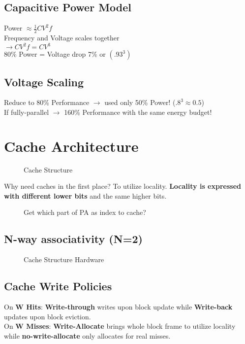 \documentclass{article}
\begin{document}
\begin{multicols*}{2}
\subsection*{Capacitive Power Model}
Power $\approx \frac{1}{2}CV^2f$ \\
Frequency and Voltage scales together \\
$\rightarrow CV^2f = CV^3$ \\
80\% Power = Voltage drop 7\% or $(.93^3)$

\subsection*{Voltage Scaling}
Reduce to 80\% Performance $\rightarrow$ used only 50\% Power! ($.8^3 \approx 0.5$) \\
If fully-parallel $\rightarrow$ 160\% Performance with the same energy budget! 

\section{Cache Architecture}
\begin{figure}[H]
  \vspace*{-1cm}
  \vspace*{-.5cm}
  \caption{Cache Structure}
\end{figure}

Why need caches in the first place? To utilize locality. \textbf{Locality is expressed with different lower bits} and the same higher bits.

\begin{figure}[H]
  \caption{Get which part of PA as index to cache?}
\end{figure}

\subsection*{N-way associativity (N=2)}
\begin{figure}[H]
  \caption{Cache Structure Hardware}
\end{figure}

\subsection*{Cache Write Policies}
On \textbf{W Hits}: \textbf{Write-through} writes upon block update while \textbf{Write-back} updates upon block eviction. \\
On \textbf{W Misses}: \textbf{Write-Allocate} brings whole block frame to utilize locality while \textbf{no-write-allocate} only allocates for real misses.


\end{multicols*}
\end{document}
